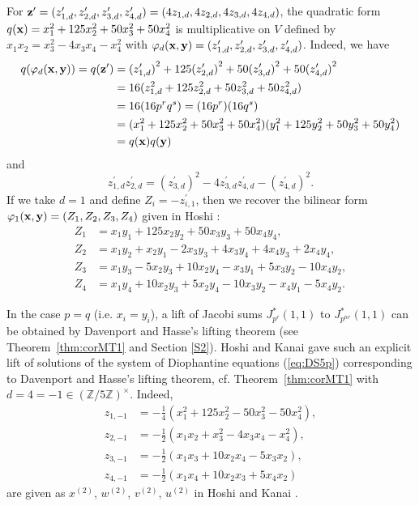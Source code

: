 \documentclass[a4paper, 11pt]{amsart}
\newcommand{\Z}{\mathbb Z}
\theoremstyle{plain}
\theoremstyle{definition}
\numberwithin{equation}{section}
\begin{document}
For 
${\bf z}^{\prime} = (z_{1,d}^{\prime},z_{2,d}^{\prime},z_{3,d}^{\prime},z_{4,d}^{\prime})=(4z_{1,d},4z_{2,d},4z_{3,d},4z_{4,d})$, 
the quadratic form $q({\bf x})=x_1^2+125x_2^2+50x_3^2+50x_4^2$ is 
multiplicative on $V$ defined by $x_1x_2=x_3^2-4x_3x_4-x_4^2$
with 
$\varphi_d ({\bf x}, {\bf y})=(z_{1,d}^{\prime}, z_{2,d}^{\prime}, z_{3,d}^{\prime}, z_{4,d}^{\prime})$. 
Indeed, we have
\begin{align*}
q(\varphi_d ({\bf x}, {\bf y}))=q({\bf z}^{\prime})
&={(z_{1,d}^{\prime})}^2+125{(z_{2,d}^{\prime})}^2+50{(z_{3,d}^{\prime})}^2+50{(z_{4,d}^{\prime})}^2\\
&=16(z_{1,d}^2+125z_{2,d}^2+50z_{3,d}^2+50z_{4,d}^2)\\
&=16(16p^rq^s)
=(16p^r)(16q^s)\\
&=(x_1^2+125x_2^2+50x_3^2+50x_4^2)(y_1^2+125y_2^2+50y_3^2+50y_4^2)\\
&=q({\bf x})q({\bf y})
\end{align*}
and
\[
z_{1,d}^{\prime}z_{2,d}^{\prime}={(z_{3,d}^{\prime})}^2-4z_{3,d}^{\prime}z_{4,d}^{\prime}-{(z_{4,d}^{\prime})}^2.
\]
If we take $d=1$ and define $Z_{i}=-z^{\prime}_{i,1}$, 
then we recover the bilinear form $\varphi_1 ({\bf x}, {\bf y})=(Z_1,Z_2,Z_3,Z_4)$  
given in Hoshi \cite[Section 3, Equation (6)]{Hos03}:
\begin{align*}
Z_1&=x_1y_1 + 125x_2y_2 + 50x_3y_3 + 50x_4y_4,\\
Z_2&=x_1y_2 + x_2y_1 - 2x_3y_3 + 4x_3y_4 + 4x_4y_3  + 2x_4y_4,\\
Z_3&=x_1y_3 - 5x_2y_3 + 10x_2y_4 - x_3y_1 + 5x_3y_2 - 10x_4y_2,\\
Z_4&=x_1y_4 + 10x_2y_3 + 5x_2y_4 - 10x_3y_2 - x_4y_1 - 5x_4y_2.
\end{align*}

In the case
$p=q$ (i.e. $x_i=y_i$), 
a lift of Jacobi sums $J^\ast_{p^r}(1,1)$
to $J^\ast_{p^{nr}}(1,1)$
can be obtained by Davenport and Hasse's lifting theorem 
(see Theorem~\ref{thm:corMT1} and Section \ref{S2}).  
Hoshi and Kanai \cite[Section 7, (2) $e=5$]{HK22} 
gave such an explicit lift of solutions of the system of Diophantine equations (\ref{eq:DS5p}) corresponding to Davenport and Hasse's lifting theorem, cf. Theorem~\ref{thm:corMT1} with 
$d=4=-1 \in(\Z/5\Z)^{\times}$. 
Indeed,
\begin{align*}
z_{1,-1}&=-\frac{1}{4}(x_1^2+125x_2^2-50x_3^2-50x_4^2),\\
z_{2,-1}&=-\frac{1}{2}(x_1x_2+x_3^2-4x_3x_4-x_4^2),\\
z_{3,-1}&=-\frac{1}{2}(x_1x_3+10x_2x_4-5x_3x_2),\\
z_{4,-1}&=-\frac{1}{2}(x_1x_4+10x_2x_3+5x_4x_2)
\end{align*}
are given as
$x^{(2)}$, $w^{(2)}$, $v^{(2)}$, $u^{(2)}$ 
in Hoshi and Kanai \cite[page 21, lines 10--13]{HK22}.\\
\end{document}
